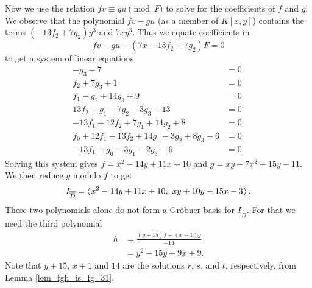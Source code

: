 Now we use the relation $fv \equiv gu \pmod F$ to solve for the coefficients of $f$ and $g$.
We observe that the polynomial $fv - gu$ (as a member of $K[x,y]$) contains the terms
$(-13f_2 + 7g_2)y^3$ and $7xy^3$.
Thus we equate coefficients in 
\[ fv - gu - (7x - 13f_2 + 7g_2)F = 0 \]
to get a system of linear equations
\begin{align*}
  -g_3 - 7 &= 0 \\
  f_2 + 7g_3 + 1 &= 0 \\
  f_1 - g_2 + 14g_3 + 9 &= 0 \\
  13f_2 - g_1 - 7g_2 - 3g_3 - 13 &= 0 \\
  -13f_1 + 12f_2 + 7g_1 + 14g_2 + 8 &= 0 \\
  f_0 + 12f_1 - 13f_2 + 14g_1 - 3g_2 + 8g_3 - 6 &= 0 \\
  -13f_1 - g_0 - 3g_1 - 2g_3 - 6 &= 0.
\end{align*}
Solving this system gives $f = x^2 - 14y + 11x + 10$ and $g = xy - 7x^2 + 15y - 11$.
We then reduce $g$ modulo $f$ to get
\[ I_{\overline{\overline D}} = \left\langle x^2 - 14y + 11x + 10, ~xy + 10y + 15x - 3 \right\rangle. \]
These two polynomials alone do not form a Gr\"obner basis for $I_{\bar{\bar D}}$.
For that we need the third polynomial
\begin{align*}
  h &= \frac {(y + 15)f - (x + 1)g} {-14} \\
    &= y^2 + 15y + 9x + 9.
\end{align*}
Note that $y + 15$, $x + 1$ and $14$ are the solutions $r$, $s$, and $t$, respectively,
from Lemma \ref{lem_fgh_is_fg_31}.
